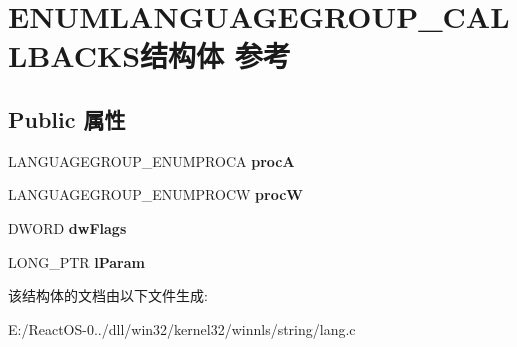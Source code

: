 \hypertarget{struct_e_n_u_m_l_a_n_g_u_a_g_e_g_r_o_u_p___c_a_l_l_b_a_c_k_s}{}\section{E\+N\+U\+M\+L\+A\+N\+G\+U\+A\+G\+E\+G\+R\+O\+U\+P\+\_\+\+C\+A\+L\+L\+B\+A\+C\+K\+S结构体 参考}
\label{struct_e_n_u_m_l_a_n_g_u_a_g_e_g_r_o_u_p___c_a_l_l_b_a_c_k_s}
\subsection*{Public 属性}
\begin{DoxyCompactItemize}
\item 
\mbox{\label{struct_e_n_u_m_l_a_n_g_u_a_g_e_g_r_o_u_p___c_a_l_l_b_a_c_k_s_a9c42711a3b55ba9811a80ddb31bff868}} 
L\+A\+N\+G\+U\+A\+G\+E\+G\+R\+O\+U\+P\+\_\+\+E\+N\+U\+M\+P\+R\+O\+CA {\bfseries procA}
\item 
\mbox{\label{struct_e_n_u_m_l_a_n_g_u_a_g_e_g_r_o_u_p___c_a_l_l_b_a_c_k_s_a86fe0bdf1e8de68c24de94539514f2a9}} 
L\+A\+N\+G\+U\+A\+G\+E\+G\+R\+O\+U\+P\+\_\+\+E\+N\+U\+M\+P\+R\+O\+CW {\bfseries procW}
\item 
\mbox{\label{struct_e_n_u_m_l_a_n_g_u_a_g_e_g_r_o_u_p___c_a_l_l_b_a_c_k_s_af591af3932a98a6882c8ba642f63a96a}} 
D\+W\+O\+RD {\bfseries dw\+Flags}
\item 
\mbox{\label{struct_e_n_u_m_l_a_n_g_u_a_g_e_g_r_o_u_p___c_a_l_l_b_a_c_k_s_a1b6cd5d22f50aab84c8041ae9830b972}} 
L\+O\+N\+G\+\_\+\+P\+TR {\bfseries l\+Param}
\end{DoxyCompactItemize}


该结构体的文档由以下文件生成\+:\begin{DoxyCompactItemize}
\item 
E\+:/\+React\+O\+S-\/0../dll/win32/kernel32/winnls/string/lang.\+c\end{DoxyCompactItemize}

